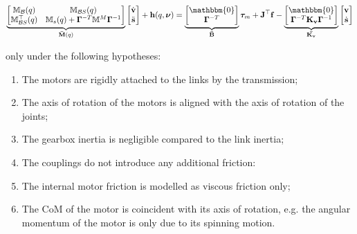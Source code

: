\begin{equation}
    \underbrace{\begin{bmatrix}
            \mathbb{M} _{\mathcal{B}}(q)        & \mathbb{M} _{\mathcal{B}S}(q)                                                      \\
            \mathbb{M} _{\mathcal{B}S} ^\top(q) & \mathbb{M} _s(q) + \boldsymbol{\Gamma} ^{-T}\mathbb{M} ^M\boldsymbol{\Gamma} ^{-1}
        \end{bmatrix}} _{\mathbf{\bar{M}}(q)}
    \begin{bmatrix}
        \dot{\mathrm{\mathbf{v}}} \\
        \ddot{\mathbf{s}}
    \end{bmatrix}+
    \mathbf{h}
    (q,\boldsymbol{\nu}) =
    \underbrace{\begin{bmatrix}
            \mathbbm{0} \\
            \boldsymbol{\Gamma} ^{-T}
        \end{bmatrix}} _{\mathbf{\bar{B}}}
    \boldsymbol{\tau} _m
    +
    \mathbf{J} ^\top
    \mathbf{f}
    -
    \underbrace{\begin{bmatrix}
            \mathbbm{0} \\
            \boldsymbol{\Gamma} ^{-T}\mathbf{K _v}\boldsymbol{\Gamma} ^{-1}
        \end{bmatrix}} _\mathbf{\bar{K _v}}
    \begin{bmatrix}
        \mathrm{\mathbf{v}} \\
        \dot{\mathbf{s}}
    \end{bmatrix}
\end{equation}

only under the following hypotheses:

\begin{enumerate}
    \item The motors are rigidly attached to the links by the transmission;
    \item The axis of rotation of the motors is aligned with the axis of rotation of the joints;
    \item The gearbox inertia is negligible compared to the link inertia;
    \item The couplings do not introduce any additional friction:
    \item The internal motor friction is modelled as viscous friction only;
    \item The \ac{CoM} of the motor is coincident with its axis of rotation, e.g. the angular momentum of the motor is only due to its spinning motion.
\end{enumerate}

